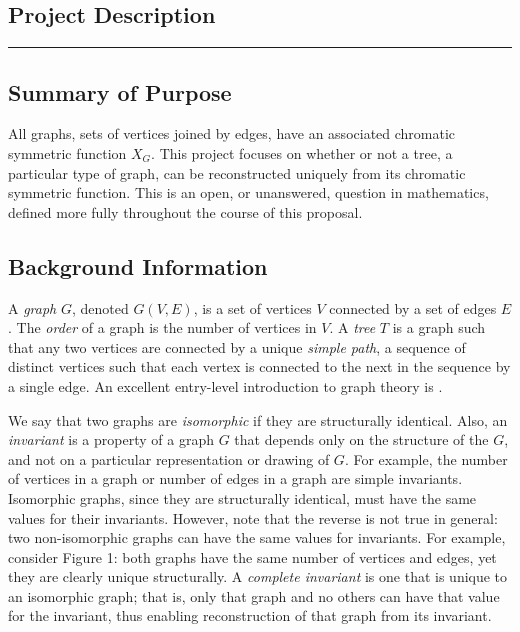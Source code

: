 \documentclass[a4paper,12pt]{article}
\begin{document}
\begin{spacing}{1}

\section*{\Large Project Description}
\hrule
\vspace{0.4cm}
\subsection*{Summary of Purpose}
All graphs, sets of vertices joined by edges, have an associated chromatic symmetric function $X_G$. This project focuses on whether or not a tree, a particular type of graph, can be reconstructed uniquely from its chromatic symmetric function. This is an open, or unanswered, question in mathematics, defined more fully throughout the course of this proposal.

\subsection*{Background Information}
A \emph{graph} $G$, denoted $G(V, E)$, is a set of vertices $V$ connected by a set of edges $E$. The \emph{order} of a graph is the number of vertices in $V$. A \emph{tree} $T$ is a graph such that any two vertices are connected by a unique \emph{simple path}, a sequence of distinct vertices such that each vertex is connected to the next in the sequence by a single edge. An excellent entry-level introduction to graph theory is \cite{walkthroughcombinatorics}.

We say that two graphs are \emph{isomorphic} if they are structurally identical.  Also, an \emph{invariant} is a property of a graph $G$ that depends only on the structure of the $G$, and not on a particular representation or drawing of $G$. For example, the number of vertices in a graph or number of edges in a graph are simple invariants. Isomorphic graphs, since they are structurally identical, must have the same values for their invariants. However, note that the reverse is not true in general: two non-isomorphic graphs can have the same values for invariants. For example, consider Figure 1: both graphs have the same number of vertices and edges, yet they are clearly unique structurally. A \emph{complete invariant} is one that is unique to an isomorphic graph; that is, only that graph and no others can have that value for the invariant, thus enabling reconstruction of that graph from its invariant.


\end{spacing}
\end{document}
